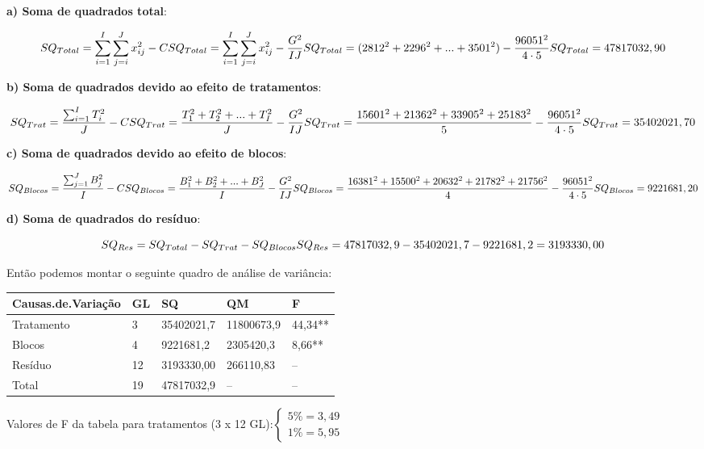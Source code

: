 \documentclass[
]{book}
\begin{document}
\textbf{a) Soma de quadrados total}:

\[
SQ_{Total} = \sum_{i=1}^I\sum_{j=i}^Jx_{ij}^2 - C \\
SQ_{Total} = \sum_{i=1}^I\sum_{j=i}^Jx_{ij}^2 - \frac{G^2}{IJ} \\
SQ_{Total} = (2812^2+2296^2+...+3501^2) - \frac{96051^2}{4\cdot5}\\
SQ_{Total} = 47817032,90
\]

\textbf{b) Soma de quadrados devido ao efeito de tratamentos}:

\[
SQ_{Trat} = \frac{\sum_{i=1}^IT_i^2}{J} - C \\
SQ_{Trat} = \frac{T_1^2+T_2^2+...+T_I^2}{J} - \frac{G^2}{IJ}\\
SQ_{Trat} = \frac{15601^2+21362^2+33905^2+25183^2}{5} - \frac{96051^2}{4\cdot5}\\ SQ_{Trat}= 35402021,70
\]

\textbf{c) Soma de quadrados devido ao efeito de blocos}:

\[
SQ_{Blocos} = \frac{\sum_{j=1}^JB_j^2}{I} - C \\
SQ_{Blocos} = \frac{B_1^2+B_2^2+...+B_J^2}{I} - \frac{G^2}{IJ}\\
SQ_{Blocos} = \frac{16381^2+15500^2+20632^2+21782^2+21756^2}{4} - \frac{96051^2}{4\cdot5}\\ SQ_{Blocos}= 9221681,20
\]

\textbf{d) Soma de quadrados do resíduo}:

\[
SQ_{Res} = SQ_{Total} - SQ_{Trat} - SQ_{Blocos}\\
SQ_{Res} = 47817032,9-35402021,7-9221681,2=3193330,00
\]

Então podemos montar o seguinte quadro de análise de variância:

\begin{table}[H]
\centering
\begin{tabular}{l|l|l|l|l}
\hline
Causas.de.Variação & GL & SQ & QM & F\\
\hline
Tratamento & 3 & 35402021,7 & 11800673,9 & 44,34**\\
\hline
Blocos & 4 & 9221681,2 & 2305420,3 & 8,66**\\
\hline
Resíduo & 12 & 3193330,00 & 266110,83 & --\\
\hline
Total & 19 & 47817032,9 & -- & --\\
\hline
\end{tabular}
\end{table}

Valores de F da tabela para tratamentos (3 x 12 GL):\(\begin{cases} 5\%=3,49 \\ 1\%=5,95 \end{cases}\)
\end{document}
